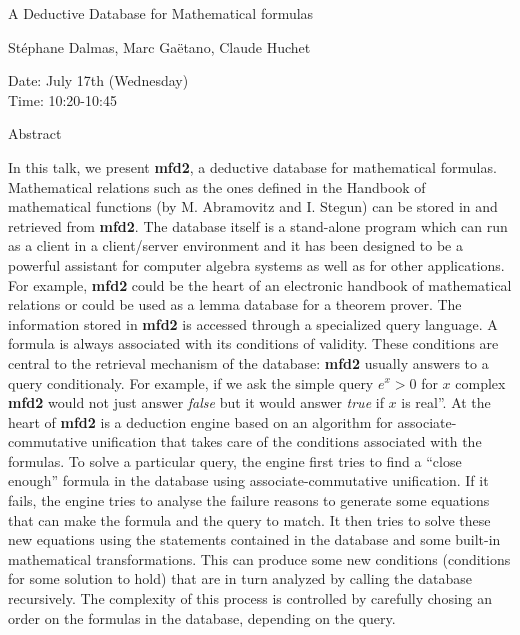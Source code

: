 \begin{center}
\LARGE
A Deductive Database for Mathematical formulas
\end{center}

\begin{center}
\Large
St\'ephane Dalmas, Marc Ga\"etano, Claude Huchet
\end{center}

\noindent
Date: July 17th (Wednesday)\\
Time:  10:20-10:45\\

\begin{center}
\large
Abstract
\end{center}

In this talk, we present {\bf mfd2}, a deductive database for
mathematical formulas. Mathematical relations such as the ones defined
in the Handbook of mathematical functions (by M. Abramovitz and I.
Stegun) can be stored in and retrieved from {\bf mfd2}.  The database
itself is a stand-alone program which can run as a client in a
client/server environment and it has been designed to be a powerful
assistant for computer algebra systems as well as for other
applications. For example, {\bf mfd2} could be the heart of an
electronic handbook of mathematical relations or could be used as a
lemma database for a theorem prover. The information stored in {\bf
  mfd2} is accessed through a specialized query language.  A formula
is always associated with its conditions of validity. These conditions
are central to the retrieval mechanism of the database: {\bf mfd2}
usually answers to a query conditionaly. For example, if we ask the
simple query $e^x > 0$ for $x$ complex {\bf mfd2} would not just
answer {\it false} but it would answer {\it true} if $x$ is real''.
At the heart of {\bf mfd2} is a deduction engine based on an algorithm
for associate-commutative unification that takes care of the
conditions associated with the formulas. To solve a particular query,
the engine first tries to find a ``close enough'' formula in the
database using associate-commutative unification. If it fails, the
engine tries to analyse the failure reasons to generate some equations
that can make the formula and the query to match. It then tries to
solve these new equations using the statements contained in the
database and some built-in mathematical transformations. This can
produce some new conditions (conditions for some solution to hold)
that are in turn analyzed by calling the database recursively. The
complexity of this process is controlled by carefully chosing an order
on the formulas in the database, depending on the query.

